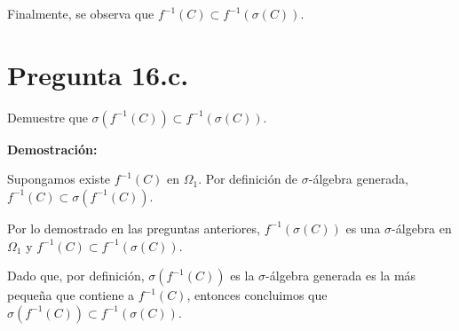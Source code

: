 \documentclass[11pt]{article}
\begin{document}
Finalmente, se observa que $\mathit{f}^{-1} (C) \subset \mathit{f}^{-1} (\sigma(C))$.


\section{Pregunta 16.c.}

Demuestre que $\sigma(\mathit{f}^{-1}(C)) \subset \mathit{f}^{-1}(\sigma(C))$.

\textbf{Demostración:}

Supongamos existe $\mathit{f}^{-1}(C)$ en $\Omega_{1}$. Por definición de $\sigma$-álgebra generada,  $\mathit{f}^{-1}(C) \subset \sigma(\mathit{f}^{-1}(C))$.

Por lo demostrado en las preguntas anteriores, $\mathit{f}^{-1} (\sigma(C))$ es una $\sigma$-álgebra en $\Omega_{1}$ y $\mathit{f}^{-1} (C) \subset \mathit{f}^{-1} (\sigma(C))$.

Dado que, por definición, $\sigma(\mathit{f}^{-1}(C))$ es la $\sigma$-álgebra generada es la más pequeña que contiene a $\mathit{f}^{-1}(C)$, entonces concluimos que $\sigma(\mathit{f}^{-1}(C)) \subset \mathit{f}^{-1}(\sigma(C))$.
\end{document}
